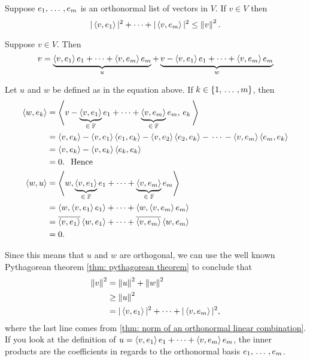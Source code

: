 \begin{thm}
  Suppose $e_1, \ddd, e_m$ is an orthonormal list of vectors in $V$. If $v \in V$ then
  \begin{equation}
    |\ip{v}{e_1}|^2 + \cdots + |\ip{v}{e_m}|^2 \leq \norm{v}^2.
  \end{equation}
\end{thm}
\begin{prf}
  Suppose $v \in V$. Then
  \begin{equation}
    v= \underbrace{\ip{v}{e_1}e_1 + \cdots + \ip{v}{e_m} e_m}_u + \underbrace{v - \ip{v}{e_1}e_1 + \cdots + \ip{v}{e_m} e_m}_w
  \end{equation}

  Let $u$ and $w$ be defined as in the equation above. If $k \in \{1, \ddd, m\}$, then
  \begin{equation}
    \begin{aligned}
      \ip{w}{e_k}
      &=\ip{v - \underbrace{\ip{v}{e_1}}_{\in \; \myF}e_1 + \cdots + \underbrace{\ip{v}{e_m}}_{\in \; \myF} e_m}{ \,e_k \,} \\
      &=\ip{v}{e_k} - \ip{v}{e_1}\ip{e_1}{e_k} - \ip{v}{e_2}\ip{e_2}{e_k} - \, \cdots \, - \ip{v}{e_m}\ip{e_m}{e_k} \\
      &=\ip{v}{e_k} - \ip{v}{e_k}\ip{e_k}{e_k} \\
      &=0. \mytext{Hence} \\
      \ip{w}{u}
      & = \ip{w}{\underbrace{\ip{v}{e_1}}_{\in \; \myF}e_1 + \cdots + \underbrace{\ip{v}{e_m}}_{\in \; \myF} e_m} \\
      & = \ip{w}{\ip{v}{e_1}e_1} + \cdots + \ip{w}{\ip{v}{e_m}e_m} \\
      & = \overline{\ip{v}{e_1}}\ip{w}{e_1} + \cdots + \overline{\ip{v}{e_m}}\ip{w}{e_m} \\
      & = 0.
    \end{aligned}
  \end{equation}

  Since this means that $u$ and $w$ are orthogonal, we can use the well known Pythagorean theorem \ref{thm: pythagorean theorem} to conclude that
  \begin{equation}
    \begin{aligned}
      \norm{v}^2
      &=    \norm{u}^2 + \norm{w}^2 \\
      &\geq \norm{u}^2 \\
      &= |\ip{v}{e_1}|^2 + \cdots + |\ip{v}{e_m}|^2,
    \end{aligned}
  \end{equation}
  where the last line comes from \ref{thm: norm of an orthonormal linear combination}. If you look at the definition of $u=\ip{v}{e_1}e_1 + \cdots + \ip{v}{e_m} e_m$, the inner products are the coefficients in regards to the orthonormal basis $e_1, \ddd, e_m$.
\end{prf}

